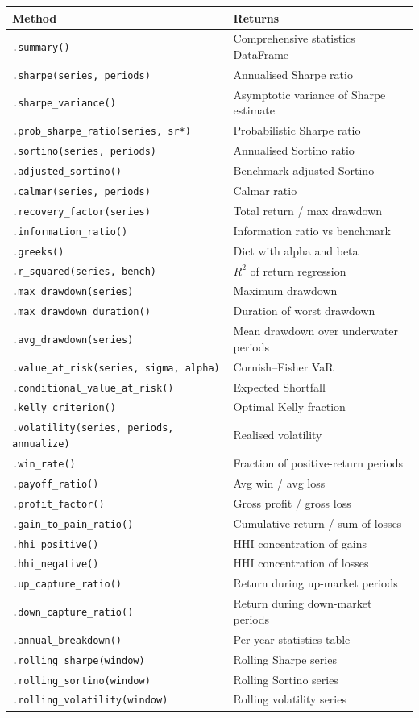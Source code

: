 \documentclass[11pt,a4paper]{article}
\begin{document}
\begin{longtable}{@{}p{5.5cm}p{8.5cm}@{}}
\toprule
Method & Returns \\
\midrule
\endhead
\texttt{.summary()} & Comprehensive statistics DataFrame \\
\texttt{.sharpe(series, periods)} & Annualised Sharpe ratio \\
\texttt{.sharpe\_variance()} & Asymptotic variance of Sharpe estimate \\
\texttt{.prob\_sharpe\_ratio(series, sr*)} & Probabilistic Sharpe ratio \\
\texttt{.sortino(series, periods)} & Annualised Sortino ratio \\
\texttt{.adjusted\_sortino()} & Benchmark-adjusted Sortino \\
\texttt{.calmar(series, periods)} & Calmar ratio \\
\texttt{.recovery\_factor(series)} & Total return / max drawdown \\
\texttt{.information\_ratio()} & Information ratio vs benchmark \\
\texttt{.greeks()} & Dict with alpha and beta \\
\texttt{.r\_squared(series, bench)} & $R^2$ of return regression \\
\texttt{.max\_drawdown(series)} & Maximum drawdown \\
\texttt{.max\_drawdown\_duration()} & Duration of worst drawdown \\
\texttt{.avg\_drawdown(series)} & Mean drawdown over underwater periods \\
\texttt{.value\_at\_risk(series, sigma, alpha)} & Cornish--Fisher VaR \\
\texttt{.conditional\_value\_at\_risk()} & Expected Shortfall \\
\texttt{.kelly\_criterion()} & Optimal Kelly fraction \\
\texttt{.volatility(series, periods, annualize)} & Realised volatility \\
\texttt{.win\_rate()} & Fraction of positive-return periods \\
\texttt{.payoff\_ratio()} & Avg win / avg loss \\
\texttt{.profit\_factor()} & Gross profit / gross loss \\
\texttt{.gain\_to\_pain\_ratio()} & Cumulative return / sum of losses \\
\texttt{.hhi\_positive()} & HHI concentration of gains \\
\texttt{.hhi\_negative()} & HHI concentration of losses \\
\texttt{.up\_capture\_ratio()} & Return during up-market periods \\
\texttt{.down\_capture\_ratio()} & Return during down-market periods \\
\texttt{.annual\_breakdown()} & Per-year statistics table \\
\texttt{.rolling\_sharpe(window)} & Rolling Sharpe series \\
\texttt{.rolling\_sortino(window)} & Rolling Sortino series \\
\texttt{.rolling\_volatility(window)} & Rolling volatility series \\
\bottomrule
\end{longtable}
\end{document}
